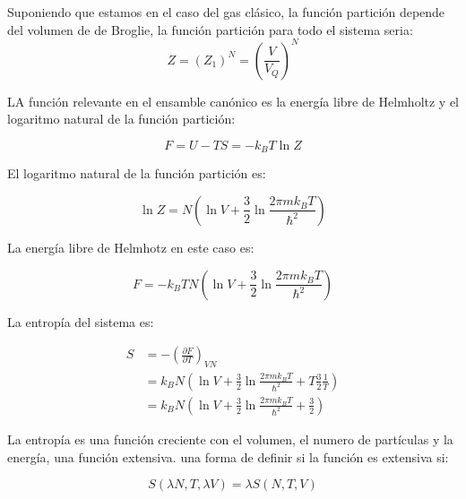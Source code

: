 \documentclass[11pt,fleqn]{book}
\begin{document}
Suponiendo que estamos en el caso del gas clásico, la función partición depende del volumen de de Broglie, la función partición para todo el sistema seria:
\begin{equation}
    Z=(Z_{1})^{N}=\left(\frac{V}{V_{Q}}\right)^{N}
    \label{Eq. 4.74}
\end{equation}

LA función relevante en el ensamble canónico es la energía libre de Helmholtz y el logaritmo natural de la función partición:

\begin{equation}
        F=U-TS=-k_{B}T\ln{Z}
    \label{Eq. 4.75}
\end{equation}

El logaritmo natural de la función partición es:

\begin{equation}
        \ln{Z}=N\left(\ln{V} +\frac{3}{2}\ln{\frac{2\pi mk_{B}T}{\hslash^{2}}}\right)
    \label{Eq. 4.76}
\end{equation}

La energía libre de Helmhotz en este caso es:

\begin{equation}
        F=-k_{B}TN\left(\ln{V} +\frac{3}{2}\ln{\frac{2\pi mk_{B}T}{\hslash^{2}}}\right)
    \label{Eq. 4.77}
\end{equation}

La entropía del sistema es:

\begin{equation}
\begin{split}
            S&=-\left(\frac{\partial F}{\partial T}\right)_{VN}\\
            &=k_{B}N\left(\ln{V} +\frac{3}{2}\ln{\frac{2\pi mk_{B}T}{\hslash^{2}}}+T\frac{3}{2}\frac{1}{T}\right)\\
            &=k_{B}N\left(\ln{V} +\frac{3}{2}\ln{\frac{2\pi mk_{B}T}{\hslash^{2}}}+\frac{3}{2}\right)
            \end{split}
    \label{Eq. 4.78}
\end{equation}

La entropía es una función creciente con el volumen, el numero de partículas y la energía, una función extensiva. una forma de definir si la función es extensiva si:

\begin{equation}
    S(\lambda N, T, \lambda V)=\lambda S(N, T, V)
    \label{Eq. 4.79}
\end{equation}
\end{document}
